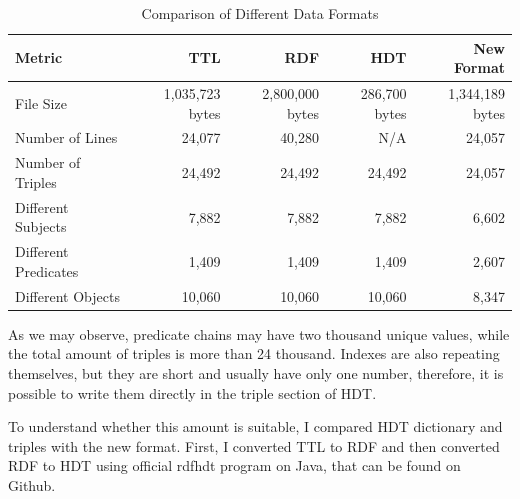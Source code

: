 

\begin{table}[htbp]
    \centering
    \begin{tabular}{|l|r|r|r|r|}
        \hline
        \textbf{Metric} & \textbf{TTL} & \textbf{RDF} & \textbf{HDT} & \textbf{New Format} \\
        \hline
        File Size & 1,035,723 bytes & 2,800,000 bytes & 286,700 bytes & 1,344,189 bytes \\
        Number of Lines & 24,077 & 40,280 & N/A & 24,057 \\
        Number of Triples & 24,492 & 24,492 & 24,492 & 24,057 \\
        Different Subjects & 7,882 & 7,882 & 7,882 & 6,602 \\
        Different Predicates & 1,409 & 1,409 & 1,409 & 2,607 \\
        Different Objects & 10,060 & 10,060 & 10,060 & 8,347 \\
        \hline
    \end{tabular}
    \caption{Comparison of Different Data Formats}
    \label{tab:comparison_table}
\end{table}

As we may observe, predicate chains may have two thousand unique values, while the total amount of triples is more than 24 thousand. Indexes are also repeating themselves, but they are short and usually have only one number, therefore, it is possible to write them directly in the triple section of HDT.

To understand whether this amount is suitable, I compared HDT dictionary and triples with the new format. First, I converted TTL to RDF and then converted RDF to HDT using official rdfhdt program on Java, that can be found on Github.

